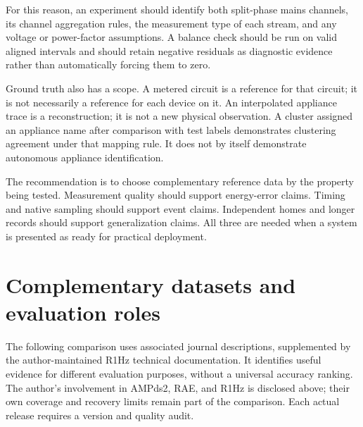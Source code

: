 \documentclass[11pt,letterpaper]{article}
\begin{document}
For this reason, an experiment should identify both split-phase mains channels, its channel aggregation rules, the measurement type of each stream, and any voltage or power-factor assumptions. A balance check should be run on valid aligned intervals and should retain negative residuals as diagnostic evidence rather than automatically forcing them to zero.

Ground truth also has a scope. A metered circuit is a reference for that circuit; it is not necessarily a reference for each device on it. An interpolated appliance trace is a reconstruction; it is not a new physical observation. A cluster assigned an appliance name after comparison with test labels demonstrates clustering agreement under that mapping rule. It does not by itself demonstrate autonomous appliance identification.

The recommendation is to choose complementary reference data by the property being tested. Measurement quality should support energy-error claims. Timing and native sampling should support event claims. Independent homes and longer records should support generalization claims. All three are needed when a system is presented as ready for practical deployment.

\section{Complementary datasets and evaluation roles}
The following comparison uses associated journal descriptions, supplemented by the author-maintained R1Hz technical documentation. It identifies useful evidence for different evaluation purposes, without a universal accuracy ranking. The author's involvement in AMPds2, RAE, and R1Hz is disclosed above; their own coverage and recovery limits remain part of the comparison. Each actual release requires a version and quality audit. \cite{ref7,ref8,ref9,ref10,ref12,ref13}
\end{document}
